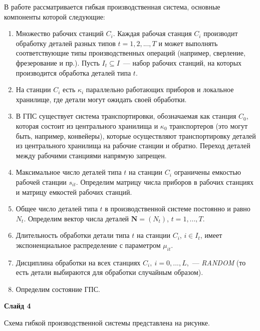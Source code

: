\documentclass[a4paper,14pt]{extarticle}
\theoremstyle{note}
\begin{document}
В работе рассматривается гибкая производственная система, основные компоненты которой следующие:
\begin{enumerate}
\item Множество рабочих станций $C_i$. Каждая рабочая станция $C_i$ производит обработку деталей разных типов $t=1,2,...,T$ и может выполнять соответствующие типы производственных операций (например, сверление, фрезерование и пр.). Пусть $I_t \subseteq I$~--- набор рабочих станций, на которых производится обработка деталей типа $t$.

\item На станции $C_i$ есть $\kappa_i$ параллельно работающих приборов и локальное хранилище, где детали могут ожидать своей обработки. 

\item В ГПС существует система транспортировки, обозначаемая как станция $C_0$, которая состоит из центрального хранилища и $\kappa_0$ транспортеров (это могут быть, например, конвейеры), которые осуществляют транспортировку деталей из центрального хранилища на рабочие станции и обратно. Переход деталей между рабочими станциями напрямую запрещен.

\item Максимальное число деталей типа $t$ на станции $C_i$ ограничены емкостью рабочей станции $s_{it}$. Определим матрицу числа приборов в рабочих станциях и матрицу емкостей рабочих станций.

\item Общее число деталей типа $t$ в производственной системе постоянно и равно $N_t$. Определим вектор числа деталей $\mathbf{N}=(N_t)$, $t=1,...,T$.

\item Длительность обработки детали типа $t$ на станции $C_i$, $i \in I_t$, имеет экспоненциальное распределение с параметром $\mu_{it}$.

\item Дисциплина обработки на всех станциях $C_i,~i=0,...,L$,~--- \textit{RANDOM} (то есть детали выбираются для обработки случайным образом).

\item Определим состояние ГПС.
\end{enumerate}


\textbf{Слайд 4}

Схема гибкой производственной системы представлена на рисунке.
\end{document}
